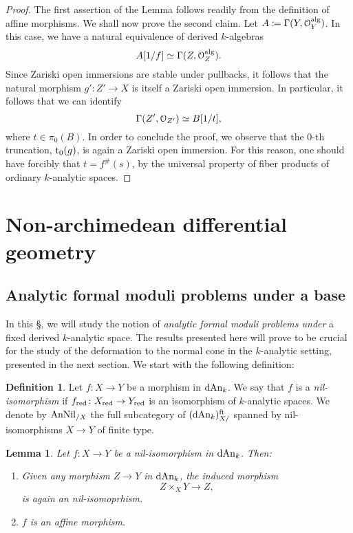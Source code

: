 \documentclass[10pt,a4paper,reqno]{amsart} %
\theoremstyle{plain}
\newtheorem{lem}[thm]{Lemma}
\theoremstyle{definition}
\newtheorem{defin}[thm]{Definition}
\theoremstyle{remark}
\numberwithin{equation}{section}
\begin{document}
\begin{proof} The first assertion of the Lemma follows readily from the definition of affine morphisms.
    We shall now prove the second claim. Let $A \coloneqq \Gamma(Y, \mathcal O_Y^\mathrm{alg})$. In this case, we have a natural equivalence of
    derived $k$-algebras
        \[
            A[1/f] \simeq \Gamma(Z, \mathcal O_Z^\mathrm{alg}).  
        \]
    Since Zariski open immersions are stable under pullbacks, it follows that the natural morphism $g' \colon Z' \to X$ is itself a Zariski
    open immersion. In particular, it follows that we can identify
        \[
            \Gamma(Z', \mathcal O_{Z'}) \simeq B[1/t],
        \]
    where $t \in \pi_0(B)$. In order to conclude the proof, we observe that the $0$-th truncation, $\mathrm{t}_0(g)$, is again a Zariski
    open immersion. For this reason, one should have forcibly that $t = f^\#(s)$, by the universal
    property of fiber products of ordinary $k$-analytic spaces.
\end{proof}


\section{Non-archimedean differential geometry}

\subsection{Analytic formal moduli problems under a base}
In this \S, we will study the notion of \emph{analytic formal moduli problems under} a fixed derived $k$-analytic space. The
results presented here will prove to be crucial for the study of the deformation to the normal cone in the $k$-analytic
setting, presented in the next section.
We start with the following definition:

\begin{defin}
    Let $f \colon X \to Y$ be a morphism in $\mathrm{dAn}_k$. We say that $f$ is a \emph{nil-isomorphism} if $f_{\mathrm{red}} \colon X_{\mathrm{red}} \to
    Y_{\mathrm{red}}$ is an isomorphism of $k$-analytic spaces. We denote by $\mathrm{AnNil}_{/ X}$ the full subcategory of $(\mathrm{dAn}_k)^{\mathrm{ft}}_{X/}$
    spanned by nil-isomorphisms $X \to Y$ of finite type.
\end{defin}

\begin{lem}
    Let $f \colon X \to Y$ be a nil-isomorphism in $\mathrm{dAn}_k$. Then:
    \begin{enumerate}
        \item Given any morphism $Z \to Y$ in $\mathrm{dAn}_k$, the induced morphism
            \[
                Z \times_X Y \to Z,  
            \]
        is again an nil-isomoprhism.
        \item $f$ is an affine morphism.
    \end{enumerate}
\end{lem}
\end{document}
